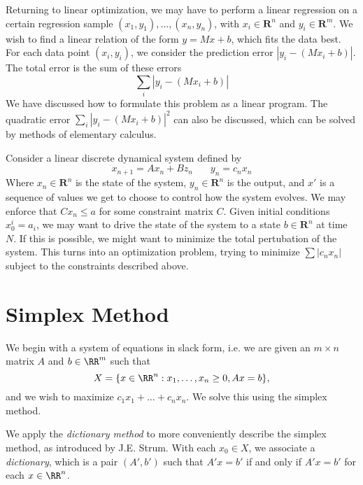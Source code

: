     \begin{example}
        Returning to linear optimization, we may have to perform a linear regression on a certain regression sample $(x_1, y_1), \dots, (x_n, y_n)$, with $x_i \in \mathbf{R}^n$ and $y_i \in \mathbf{R}^m$. We wish to find a linear relation of the form $y = Mx + b$, which fits the data best. For each data point $(x_i, y_i)$, we consider the prediction error $|y_i - (Mx_i + b)|$. The total error is the sum of these errors
        \[ \sum_i |y_i - (Mx_i + b)| \]
        We have discussed how to formulate this problem as a linear program. The quadratic error $\sum_i |y_i - (Mx_i + b)|^2$ can also be discussed, which can be solved by methods of elementary calculus.
    \end{example}

    \begin{example}
        Consider a linear discrete dynamical system defined by
        \[ x_{n+1} = Ax_n + Bz_n\ \ \ \ \ \ \ \ y_n = c_nx_n \]
        Where $x_n \in \mathbf{R}^n$ is the state of the system, $y_n \in \mathbf{R}^n$ is the output, and $x'$ is a sequence of values we get to choose to control how the system evolves. We may enforce that $C x_n \leq a$ for some constraint matrix $C$. Given initial conditions $x_0^i = a_i$, we may want to drive the state of the system to a state $b \in \mathbf{R}^n$ at time $N$. If this is possible, we might want to minimize the total pertubation of the system. This turns into an optimization problem, trying to minimize $\sum |c_nx_n|$ subject to the constraints described above.
    \end{example}






    \chapter{Simplex Method}

    We begin with a system of equations in slack form, i.e. we are given an $m \times n$ matrix $A$ and $b \in \RR^m$ such that
    \[ X = \{ x \in \RR^n: x_1, \dots, x_n \geq 0, Ax = b \}, \]
    and we wish to maximize $c_1x_1 + \dots + c_nx_n$. We solve this using the simplex method.

    We apply the \emph{dictionary method} to more conveniently describe the simplex method, as introduced by J.E. Strum. With each $x_0 \in X$, we associate a \emph{dictionary}, which is a pair $(A',b')$ such that $A'x = b'$ if and only if $A' x = b'$ for each $x \in \RR^n$. 

